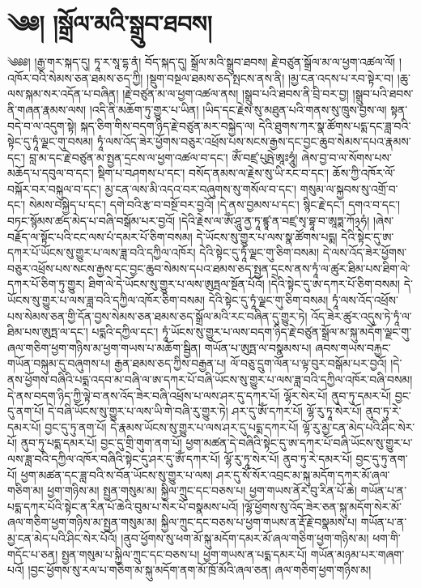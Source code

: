 \setcounter{footnote}{0} 
\chapter{༄༅། །སྒྲོལ་མའི་སྒྲུབ་ཐབས།}༄༅༅། །རྒྱ་གར་སྐད་དུ། ཏཱ་ར་སཱ་དྷ་ནཾ། བོད་སྐད་དུ། སྒྲོལ་མའི་སྒྲུབ་ཐབས། རྗེ་བཙུན་སྒྲོལ་མ་ལ་ཕྱག་འཚལ་ལོ། །འཁོར་བའི་སེམས་ཅན་ཐམས་ཅད་ཀྱི། །སྡུག་བསྔལ་ཐམས་ཅད་སྤངས་ནས་ནི། །མྱ་ངན་འདས་པ་རབ་སྟེར་བ། །ཆུ་ལས་སྐམ་སར་འདོན་པ་བཞིན། །རྗེ་བཙུན་མ་ལ་ཕྱག་འཚལ་ནས། །སྒྲུབ་པའི་ཐབས་ནི་བྲི་བར་བྱ། །སྒྲུབ་པའི་ཐབས་ནི་གཞན་རྣམས་ལས། །འདི་ནི་མཆོག་ཏུ་གྱུར་པ་ཡིན། །ཡིད་དང་རྗེས་སུ་མཐུན་པའི་གནས་སུ་ཁྲུས་བྱས་ལ། སྟན་བདེ་བ་ལ་འདུག་སྟེ། སྐད་ཅིག་གིས་བདག་ཉིད་རྗེ་བཙུན་མར་བསྐྱེད་ལ། དེའི་ཐུགས་ཀར་སྣ་ཚོགས་པདྨ་དང་ཟླ་བའི་སྟེང་དུ་ཏཱཾ་ལྗང་གུ་བསམ། ཏཱཾ་ལས་འོད་ཟེར་ཕྱོགས་བཅུར་འཕྲོས་པས་སངས་རྒྱས་དང་བྱང་ཆུབ་སེམས་དཔའ་རྣམས་དང་། བླ་མ་དང་རྗེ་བཙུན་མ་སྤྱན་དྲངས་ལ་ཕྱག་འཚལ་བ་དང་། ཨོཾ་བཛྲ་པུཥྤེ་ཨཱཿཧཱུཾ། ཞེས་བྱ་བ་ལ་སོགས་པས་མཆོད་པ་དབུལ་བ་དང་། སྡིག་པ་བཤགས་པ་དང་། བསོད་ནམས་ལ་རྗེས་སུ་ཡི་རང་བ་དང་། ཆོས་ཀྱི་འཁོར་ལོ་བསྐོར་བར་བསྐུལ་བ་དང་། མྱ་ངན་ལས་མི་འདའ་བར་བཞུགས་སུ་གསོལ་བ་དང་། གསུམ་ལ་སྐྱབས་སུ་འགྲོ་བ་དང་། སེམས་བསྐྱེད་པ་དང་། དགེ་བའི་རྩ་བ་བསྔོ་བར་བྱའོ། །དེ་ནས་བྱམས་པ་དང་། སྙིང་རྗེ་དང་། དགའ་བ་དང་། བཏང་སྙོམས་ཚད་མེད་པ་བཞི་བསྒོམ་པར་བྱའོ། །དེའི་རྗེས་ལ་ཨོཾ་ཤཱུ་ནྱ་ཏཱ་ཛྙཱ་ན་བཛྲ་སྭ་བྷཱ་བ་ཨཱཏྨ་ཀོ྅ཧཾ། །ཞེས་བརྗོད་ལ་སྟོང་པའི་ངང་ལས་པཾ་དམར་པོ་ཅིག་བསམ། དེ་ཡོངས་སུ་གྱུར་པ་ལས་སྣ་ཚོགས་པདྨ། དེའི་སྟེང་དུ་ཨ་དཀར་པོ་ཡོངས་སུ་གྱུར་པ་ལས་ཟླ་བའི་དཀྱིལ་འཁོར། དེའི་སྟེང་དུ་ཏཱཾ་ལྗང་གུ་ཅིག་བསམ། དེ་ལས་འོད་ཟེར་ཕྱོགས་བཅུར་འཕྲོས་པས་སངས་རྒྱས་དང་བྱང་ཆུབ་སེམས་དཔའ་ཐམས་ཅད་སྤྱན་དྲངས་ནས་ཏཱཾ་ལ་ཚུར་ཐིམ་པས་ཐིག་ལེ་དཀར་པོ་ཅིག་ཏུ་གྱུར། ཐིག་ལེ་དེ་ཡོངས་སུ་གྱུར་པ་ལས་ཨུཏྤལ་སྔོན་པོའོ། །དེའི་སྟེང་དུ་ཨ་དཀར་པོ་ཅིག་བསམ། དེ་ཡོངས་སུ་གྱུར་པ་ལས་ཟླ་བའི་དཀྱིལ་འཁོར་ཅིག་བསམ། དེའི་སྟེང་དུ་ཏཱཾ་ལྗང་གུ་ཅིག་བསམ། ཏཱཾ་ལས་འོད་འཕྲོས་པས་སེམས་ཅན་གྱི་དོན་བྱས་སེམས་ཅན་ཐམས་ཅད་སྒྲོལ་མའི་རང་བཞིན་དུ་གྱུར་ཏེ། འོད་ཟེར་ཚུར་འདུས་ཏེ་ཏཱཾ་ལ་ཐིམ་པས་ཨུཏྤ་ལ་དང་། པདྨའི་དཀྱིལ་དང་། ཏཱཾ་ཡོངས་སུ་གྱུར་པ་ལས་བདག་ཉིད་རྗེ་བཙུན་སྒྲོལ་མ་སྐུ་མདོག་ལྗང་གུ་ཞལ་གཅིག་ཕྱག་གཉིས་མ་ཕྱག་གཡས་པ་མཆོག་སྦྱིན། གཡོན་པ་ཨུཏྤ་ལ་བསྣམས་པ། ཞབས་གཡས་བརྐྱང་གཡོན་བསྐུམ་དུ་བཞུགས་པ། རྒྱན་ཐམས་ཅད་ཀྱིས་བརྒྱན་པ། ལོ་བཅུ་དྲུག་ལོན་པ་ལྟ་བུར་བསྒོམ་པར་བྱའོ། །དེ་ནས་ཕྱོགས་བཞིའི་པདྨ་འདབ་མ་བཞི་ལ་ཨ་དཀར་པོ་བཞི་ཡོངས་སུ་གྱུར་པ་ལས་ཟླ་བའི་དཀྱིལ་འཁོར་བཞི་བསམ། དེ་ནས་བདག་ཉིད་ཀྱི་ལྟེ་བ་ནས་འོད་ཟེར་བཞི་འཕྲོས་པ་ལས་ཤར་དུ་དཀར་པོ། ལྷོར་སེར་པོ། ནུབ་ཏུ་དམར་པོ། བྱང་དུ་ནག་པོ། དེ་བཞི་ཡོངས་སུ་གྱུར་པ་ལས་ཡི་གེ་བཞི་རུ་གྱུར་ཏེ། ཤར་དུ་ཨོཾ་དཀར་པོ། ལྷོ་རུ་ཏཱ་སེར་པོ། ནུབ་ཏུ་རེ་དམར་པོ། བྱང་དུ་ཏུ་ནག་པོ། དེ་རྣམས་ཡོངས་སུ་གྱུར་པ་ལས་ཤར་དུ་པདྨ་དཀར་པོ། ལྷོ་རུ་མྱ་ངན་མེད་པའི་ཤིང་སེར་པོ། ནུབ་ཏུ་པདྨ་དམར་པོ། བྱང་དུ་གྲི་གུག་ནག་པོ། ཕྱག་མཚན་དེ་བཞིའི་སྟེང་དུ་ཨ་དཀར་པོ་བཞི་ཡོངས་སུ་གྱུར་པ་ལས་ཟླ་བའི་དཀྱིལ་འཁོར་བཞིའི་སྟེང་དུ་ཤར་དུ་ཨོཾ་དཀར་པོ། ལྷོ་རུ་ཏཱ་སེར་པོ། ནུབ་ཏུ་རེ་དམར་པོ། བྱང་དུ་ཏུ་ནག་པོ། ཕྱག་མཚན་དང་ཟླ་བའི་ས་བོན་ཡོངས་སུ་གྱུར་པ་ལས། ཤར་དུ་སོ་སོར་འབྲང་མ་སྐུ་མདོག་དཀར་མོ་ཞལ་གཅིག་མ། ཕྱག་གཉིས་མ། སྤྱན་གསུམ་མ། སྐྱིལ་ཀྲུང་དང་བཅས་པ། ཕྱག་གཡས་ནོར་བུ་རིན་པོ་ཆེ། གཡོན་པ་ན་པདྨ་དཀར་པོའི་སྟེང་ན་རིན་པོ་ཆེའི་བུམ་པ་སེར་པོ་བསྣམས་པའོ། །ལྷོ་ཕྱོགས་སུ་འོད་ཟེར་ཅན་སྐུ་མདོག་སེར་མོ་ཞལ་གཅིག་ཕྱག་གཉིས་མ་སྤྱན་གསུམ་མ། སྐྱིལ་ཀྲུང་དང་བཅས་པ་ཕྱག་གཡས་ན་རྡོ་རྗེ་བསྣམས་པ། གཡོན་པ་ན་མྱ་ངན་མེད་པའི་ཤིང་སེར་པོའོ། །ནུབ་ཕྱོགས་སུ་ཕག་མོ་སྐུ་མདོག་དམར་མོ་ཞལ་གཅིག་ཕྱག་གཉིས་མ། ཕག་གི་གདོང་པ་ཅན། སྤྱན་གསུམ་པ་སྐྱིལ་ཀྲུང་དང་བཅས་པ། ཕྱག་གཡས་ན་པདྨ་དམར་པོ། གཡོན་མཉམ་པར་གཞག་པའོ། །བྱང་ཕྱོགས་སུ་རལ་པ་གཅིག་མ་སྐུ་མདོག་ནག་མོ་ཁྲོ་མོའི་ཞལ་ཅན། ཞལ་གཅིག་ཕྱག་གཉིས་མ། 